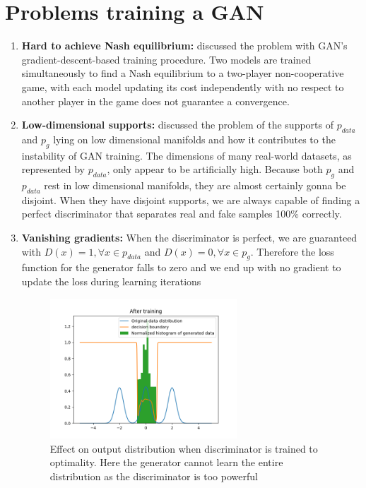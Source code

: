 \documentclass{article}
\begin{document}
\section{Problems training a GAN}
\label{problems training a GAN}
\begin{enumerate}
    \item \textbf{Hard to achieve Nash equilibrium:} \cite{improved_training} discussed the problem with GAN’s gradient-descent-based training procedure. Two models are trained simultaneously to find a Nash equilibrium to a two-player non-cooperative game, with each model updating its cost independently with no respect to another player in the game does not guarantee a convergence.
    \item \textbf{Low-dimensional supports:} \cite{towards} discussed the problem of the supports of $p_{data}$ and $p_g$ lying on low dimensional manifolds and how it contributes to the instability of GAN training.\newline
    The dimensions of many real-world datasets, as represented by $p_{data}$, only appear to be artificially high.\newline
    Because both $p_g$ and $p_{data}$ rest in low dimensional manifolds, they are almost certainly gonna be disjoint. When they have disjoint supports, we are always capable of finding a perfect discriminator that separates real and fake samples 100\% correctly.
    \item \textbf{Vanishing gradients:} When the discriminator is perfect, we are guaranteed with $D(x)=1,\forall x\in p_{data}$ and $D(x)=0,\forall x\in p_g$. Therefore the loss function for the generator falls to zero and we end up with no gradient to update the loss during learning iterations
    \begin{figure}[h!]
        \includegraphics[width=7cm]{d_more_than_g.png}
        \caption{Effect on output distribution when discriminator is trained to optimality. Here the generator cannot learn the entire distribution as the discriminator is too powerful }

\end{figure}
\end{enumerate}
\end{document}
